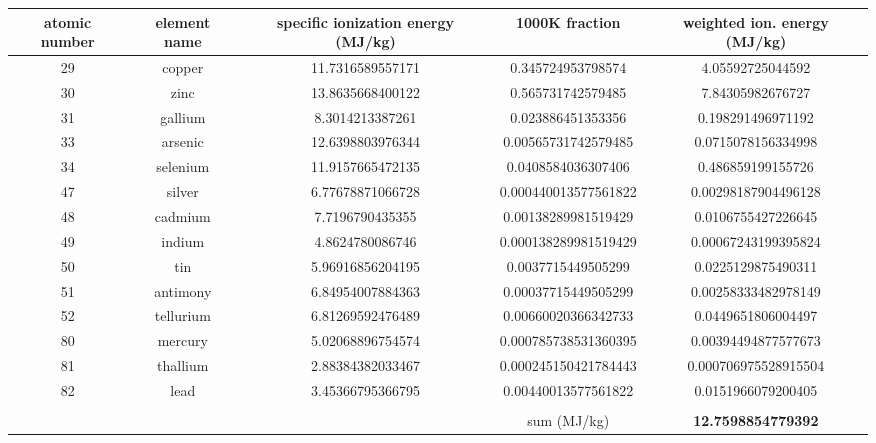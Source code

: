 \documentclass[a4paper]{article}
\begin{document}
	\begin{center}
		\scriptsize
		\begin{tabular}{|c|c|c|c|c|}
			\hline
			atomic number & element name & specific ionization energy (MJ/kg) & 1000K fraction & weighted ion. energy (MJ/kg) \\
			\hline
			29 & copper & 11.7316589557171 & 0.345724953798574 & 4.05592725044592 \\
			\hline
			30 & zinc & 13.8635668400122 & 0.565731742579485 & 7.84305982676727 \\
			\hline
			31 & gallium & 8.3014213387261 & 0.023886451353356 & 0.198291496971192 \\
			\hline
			33 & arsenic & 12.6398803976344 & 0.00565731742579485 & 0.0715078156334998 \\
			\hline
			34 & selenium & 11.9157665472135 & 0.0408584036307406 & 0.486859199155726 \\
			\hline
			47 & silver & 6.77678871066728 & 0.000440013577561822 & 0.00298187904496128 \\
			\hline
			48 & cadmium & 7.7196790435355 & 0.00138289981519429 & 0.0106755427226645 \\
			\hline
			49 & indium & 4.8624780086746 & 0.000138289981519429 & 0.00067243199395824 \\
			\hline
			50 & tin & 5.96916856204195 & 0.0037715449505299 & 0.0225129875490311 \\
			\hline
			51 & antimony & 6.84954007884363 & 0.00037715449505299 & 0.00258333482978149 \\
			\hline
			52 & tellurium & 6.81269592476489 & 0.00660020366342733 & 0.0449651806004497 \\
			\hline
			80 & mercury & 5.02068896754574 & 0.000785738531360395 & 0.00394494877577673 \\
			\hline
			81 & thallium & 2.88384382033467 & 0.000245150421784443 & 0.000706975528915504 \\
			\hline
			82 & lead & 3.45366795366795 & 0.00440013577561822 & 0.0151966079200405 \\
			\hline
			&  &  &  &  \\
			\hline
			&  &  & sum (MJ/kg) & \textbf{12.7598854779392} \\
			\hline
		\end{tabular}
	\end{center}
	
\end{document}
